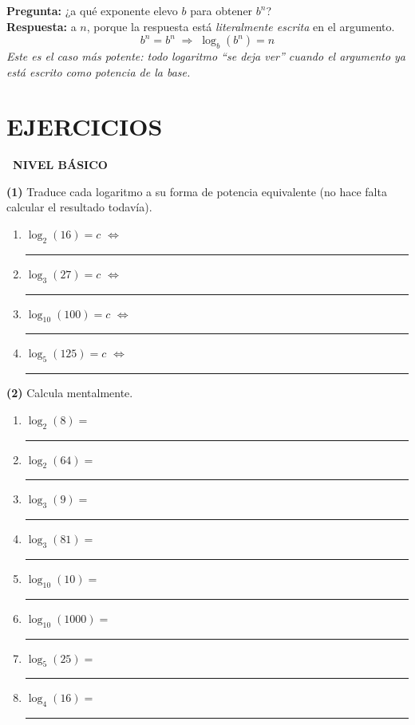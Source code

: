 \documentclass[11pt,a4paper]{article}
\newcommand{\nivelbasico}{%
  \par\smallskip\colorbox{green!60!black}{\color{white}\small\bfseries\ NIVEL BÁSICO\ }\par\smallskip}
\begin{document}
\begin{tcolorbox}[propiedad, title={Caso 3: $\log_b(b^{n}) = n$}]
\textbf{Pregunta:} ¿a qué exponente elevo $b$ para obtener $b^{n}$?\\
\textbf{Respuesta:} a $n$, porque la respuesta está \emph{literalmente escrita} en el argumento.
\[
  b^{n} = b^{n} \;\Longrightarrow\; \log_b(b^{n}) = n
\]
\textit{Este es el caso más potente: todo logaritmo ``se deja ver'' cuando el argumento ya está escrito como potencia de la base.}
\end{tcolorbox}

\newpage

\section{EJERCICIOS}

\nivelbasico

\textbf{(1)} Traduce cada logaritmo a su forma de potencia equivalente (no hace falta calcular el resultado todavía).
\begin{enumerate}[label=\alph*),leftmargin=1cm]
  \item $\log_2(16) = c$ \hfill $\Longleftrightarrow$ \hfill \rule{4cm}{0.4pt}
  \item $\log_3(27) = c$ \hfill $\Longleftrightarrow$ \hfill \rule{4cm}{0.4pt}
  \item $\log_{10}(100) = c$ \hfill $\Longleftrightarrow$ \hfill \rule{4cm}{0.4pt}
  \item $\log_5(125) = c$ \hfill $\Longleftrightarrow$ \hfill \rule{4cm}{0.4pt}
\end{enumerate}

\textbf{(2)} Calcula mentalmente.
\begin{enumerate}[label=\alph*),leftmargin=1cm]
  \item $\log_2(8) = $ \rule{2cm}{0.4pt}
  \item $\log_2(64) = $ \rule{2cm}{0.4pt}
  \item $\log_3(9) = $ \rule{2cm}{0.4pt}
  \item $\log_3(81) = $ \rule{2cm}{0.4pt}
  \item $\log_{10}(10) = $ \rule{2cm}{0.4pt}
  \item $\log_{10}(1000) = $ \rule{2cm}{0.4pt}
  \item $\log_5(25) = $ \rule{2cm}{0.4pt}
  \item $\log_4(16) = $ \rule{2cm}{0.4pt}
\end{enumerate}
\end{document}
